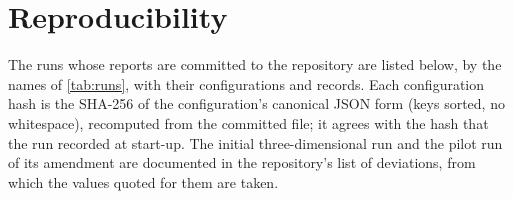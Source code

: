 \section{Reproducibility}\label{app:repro}
\setcounter{table}{0}\setcounter{figure}{0}\setcounter{equation}{0}

The runs whose reports are committed to the repository are listed below, by the names of
\cref{tab:runs}, with their configurations and records. Each configuration hash is the
SHA-256 of the configuration's canonical JSON form (keys sorted, no whitespace), recomputed
from the committed file; it agrees with the hash that the run recorded at start-up. The
initial three-dimensional run and the pilot run of its amendment are documented in the
repository's list of deviations, from which the values quoted for them are taken.



